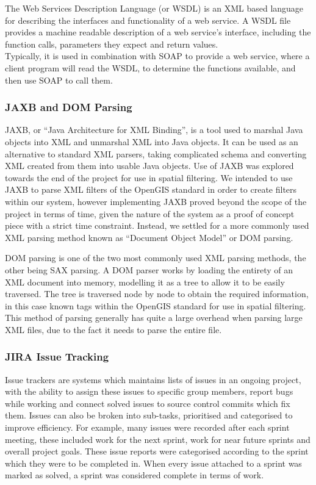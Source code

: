 \documentclass[a4paper, 12pt]{article}
\begin{document}
The Web Services Description Language (or WSDL) is an XML based language for describing the interfaces and functionality of a web service. A WSDL file provides a machine readable description of a web service's interface, including the function calls, parameters they expect and return values.\\
Typically, it is used in combination with SOAP to provide a web service, where a client program will read the WSDL, to determine the functions available, and then use SOAP to call them.

\subsubsection{JAXB and DOM Parsing}

JAXB, or ``Java Architecture for XML Binding'', is a tool used to marshal Java objects into XML and unmarshal XML into Java objects. It can be used as an alternative to standard XML parsers, taking complicated schema and converting XML created from them into usable Java objects. Use of JAXB was explored towards the end of the project for use in spatial filtering. We intended to use JAXB to parse XML filters of the OpenGIS standard in order to create filters within our system, however implementing JAXB proved beyond the scope of the project in terms of time, given the nature of the system as a proof of concept piece with a strict time constraint. Instead, we settled for a more commonly used XML parsing method known as ``Document Object Model'' or DOM parsing.

DOM parsing is one of the two most commonly used XML parsing methods, the other being SAX parsing. A DOM parser works by loading the entirety of an XML document into memory, modelling it as a tree to allow it to be easily traversed. The tree is traversed node by node to obtain the required information, in this case known tags within the OpenGIS standard for use in spatial filtering. This method of parsing generally has quite a large overhead when parsing large XML files, due to the fact it needs to parse the entire file.

\subsubsection{JIRA Issue Tracking}

Issue trackers are systems which maintains lists of issues in an ongoing project, with the ability to assign these issues to specific group members, report bugs while working and connect solved issues to source control commits which fix them. Issues can also be broken into sub-tasks, prioritised and categorised to improve efficiency. For example, many issues were recorded after each sprint meeting, these included work for the next sprint, work for near future sprints and overall project goals. These issue reports were categorised according to the sprint which they were to be completed in. When every issue attached to a sprint was marked as solved, a sprint was considered complete in terms of work.
\end{document}
